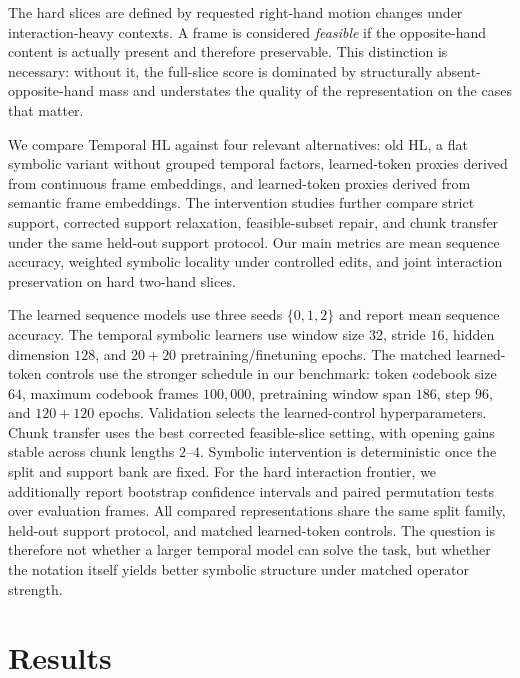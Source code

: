 \documentclass[letterpaper]{article}
\newcommand{\thl}{Temporal HL}
\begin{document}
The hard slices are defined by requested right-hand motion changes under
interaction-heavy contexts. A frame is considered \emph{feasible} if the
opposite-hand content is actually present and therefore preservable. This
distinction is necessary: without it, the full-slice score is dominated by
structurally absent-opposite-hand mass and understates the quality of the
representation on the cases that matter.

We compare \thl{} against four relevant alternatives: old HL, a flat symbolic
variant without grouped temporal factors, learned-token proxies derived from
continuous frame embeddings, and learned-token proxies derived from semantic
frame embeddings. The intervention studies further compare strict support,
corrected support relaxation, feasible-subset repair, and chunk transfer under
the same held-out support protocol. Our main metrics are mean sequence accuracy,
weighted symbolic locality under controlled edits, and joint interaction
preservation on hard two-hand slices.

The learned sequence models use three seeds $\{0,1,2\}$ and report mean
sequence accuracy. The temporal symbolic learners use window size $32$, stride
$16$, hidden dimension $128$, and $20{+}20$ pretraining/finetuning epochs. The
matched learned-token controls use the stronger schedule in our benchmark:
token codebook size $64$, maximum codebook frames $100{,}000$, pretraining
window span $186$, step $96$, and $120{+}120$ epochs. Validation selects the
learned-control hyperparameters. Chunk transfer uses the best corrected
feasible-slice setting, with opening gains stable across chunk lengths $2$--$4$.
Symbolic intervention is deterministic once the split and support bank are
fixed. For the hard interaction frontier, we additionally report bootstrap
confidence intervals and paired permutation tests over evaluation frames.
All compared representations share the same split family, held-out support
protocol, and matched learned-token controls. The question is therefore not
whether a larger temporal model can solve the task, but whether the notation
itself yields better symbolic structure under matched operator strength.

\section{Results}
\end{document}
